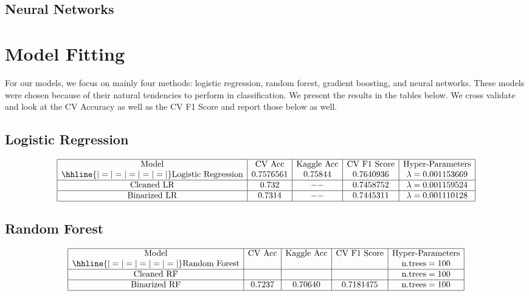 \documentclass{article}
\begin{document}
\subsection{Neural Networks}

\section{Model Fitting}
For our models, we focus on mainly four methods: logistic regression, random forest, gradient boosting, and neural networks. These models were chosen because of their natural tendencies to perform in classification. We present the results in the tables below. We cross validate and look at the CV Accuracy as well as the CV F1 Score and report those below as well.

\subsection{Logistic Regression}
$$\begin{array}{|c|c|c|c|c|}
\hline
\text{Model} & \text{CV Acc} & \text{Kaggle Acc} & \text{CV F1 Score} & \text{Hyper-Parameters} \\
\hhline{|=|=|=|=|=|}
\text{Logistic Regression} & 0.7576561 & 0.75844 & 0.7640936 & \lambda = 0.001153669\\
\hline
\text{Cleaned LR} & 0.732 & -- & 0.7458752 & \lambda = 0.001159524 \\
\hline
\text{Binarized LR} & 0.7314 & -- & 0.7445311 & \lambda = 0.001110128 \\
\hline
\end{array}$$

\subsection{Random Forest}
$$\begin{array}{|c|c|c|c|c|}
\hline
\text{Model} & \text{CV Acc} & \text{Kaggle Acc} & \text{CV F1 Score} & \text{Hyper-Parameters}   \\
\hhline{|=|=|=|=|=|}
\text{Random Forest} &  &  &  & \text{n.trees} = 100 \\
\hline
\text{Cleaned RF} &  &  &  & \text{n.trees} = 100 \\
\hline
\text{Binarized RF} & 0.7237 & 0.70640 & 0.7181475 & \text{n.trees} = 100 \\
\hline
\end{array}$$
\end{document}
